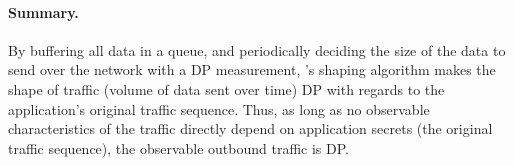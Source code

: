 \paragraph{Summary.}
By buffering all data in a queue, and periodically deciding the size of the data
to send over the network with a DP measurement, \sys's shaping algorithm
makes the shape of traffic (volume of data sent over time) DP with regards to
the application's original traffic sequence.
Thus, as long as no observable characteristics of the traffic directly depend on
application secrets (the original traffic sequence), the observable outbound traffic
is DP.




